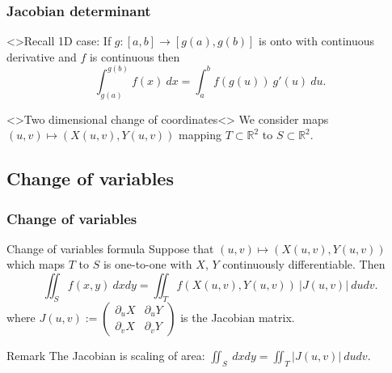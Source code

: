 \documentclass[aspectratio=169,handout]{beamer}
\newcommand{\abs}[1]{\left|#1\right|} %
\newcommand{\bR}{\mathbb{R}} %
\begin{document}
\begin{frame}
    \frametitle{Jacobian determinant}

    \structure<>{Recall 1D case:}
    If \(g : [a,b] \to [g(a),g(b)]\) is onto with continuous derivative and \(f\) is continuous then
    \[
      \int_{g(a)}^{g(b)}    f(x) \ dx = \int_{a}^{b} f(g(u)) \ g'(u) \ du.
    \]

    \begin{block}<>{Two dimensional change of coordinates}<>
        We consider maps \((u,v) \mapsto (X(u,v),Y(u,v))\) mapping  \(T\subset \bR^2\) to  \(S\subset \bR^2\).
        
    \end{block}

\end{frame}


\subsection{Change of variables}

\begin{frame}
    \frametitle{Change of variables}

    \begin{block}{Change of variables formula}
        Suppose that \((u,v) \mapsto (X(u,v),Y(u,v))\) which maps \(T\) to \(S\) is one-to-one with \(X\), \(Y\) continuously differentiable. Then
        \[
            \iint_{S} f(x,y) \ dxdy = \iint_{T} f(X(u,v),Y(u,v)) \ \abs{J(u,v)} \ dudv.
        \]
        where 
        \(J(u,v):= \begin{pmatrix}
            \partial_u X & \partial_u Y \\ \partial_v X & \partial_v Y
        \end{pmatrix}\) is the Jacobian matrix.
    \end{block}

    \begin{block}{Remark}
        The Jacobian is scaling of area: \(\displaystyle\iint_{S} \ dx dy = \displaystyle\iint_{T}  \abs{J(u,v)} \ dudv \).
    \end{block} 

\end{frame}
\end{document}
